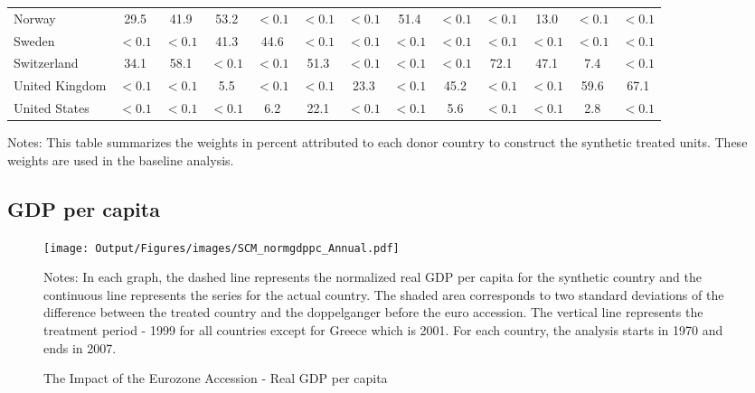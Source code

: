 \documentclass[12pt]{article}
\newcommand{\annote}[1]{\parbox{\textwidth}{\renewcommand{\baselinestretch}{1.0}\vspace{12pt} \small Notes: #1}}
\begin{document}
\begin{appendices}
\begin{landscape}
\begin{table}[htbp]
\begin{tabular}{lcccccccccccc}
Norway &       29.5 &       41.9 &      53.2 &       $<0.1$ &       $<0.1$ &       $<0.1$ &     51.4 &       $<0.1$ &       $<0.1$ &      13.0 &       $<0.1$ &       $<0.1$ \\  
Sweden &        $<0.1$ &       $<0.1$ &      41.3 &     44.6 &     $<0.1$ &       $<0.1$ &       $<0.1$ &      $<0.1$ &       $<0.1$ &       $<0.1$ &       $<0.1$ &       $<0.1$ \\  
Switzerland &       34.1 &      58.1 &     $<0.1$ &       $<0.1$ &     51.3 &       $<0.1$ &       $<0.1$ &      $<0.1$ &      72.1 &      47.1 &      7.4 &      $<0.1$ \\  
United Kingdom &      $<0.1$ &       $<0.1$ &       5.5 &       $<0.1$ &       $<0.1$ &      23.3 &       $<0.1$ &       45.2 &       $<0.1$ &       $<0.1$ &      59.6 &       67.1 \\  
United States &        $<0.1$ &       $<0.1$ &     $<0.1$ &     6.2 &      22.1 &      $<0.1$ &       $<0.1$ &     5.6 &       $<0.1$ &       $<0.1$ &       2.8 &     $<0.1$ \\
\bottomrule
\end{tabular}
\annote{This table summarizes the weights in percent attributed to each donor country to construct the synthetic treated units. These weights are used in the baseline analysis.}
\end{table}
\end{landscape}
\clearpage

\subsection{GDP per capita}

\begin{figure}[h!]
    \centering
    \caption{The Impact of the Eurozone Accession - Real GDP per capita}
    \label{F_rgdpnapc}
    \texttt{[image: Output/Figures/images/SCM\_normgdppc\_Annual.pdf]}
    \annote{In each graph, the dashed line represents the normalized real GDP per capita for the synthetic country and the continuous line represents the series for the actual country. The shaded area corresponds to two standard deviations of the difference between the treated country and the doppelganger before the euro accession. The vertical line represents the treatment period - 1999 for all countries except for Greece which is 2001. For each country, the analysis starts in 1970 and ends in 2007. }
    \label{F_normgdppc}
\end{figure}


\clearpage
\begin{landscape}

\end{landscape}
\end{appendices}
\end{document}
